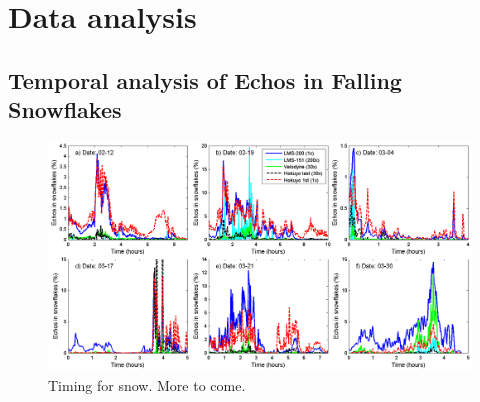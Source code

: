 \section{Data analysis}
\label{sec:data-analysis}

\subsection{Temporal analysis of Echos in Falling Snowflakes}
\begin{figure}[th]
    \centering
    \includegraphics[width=0.95\linewidth]{./img/TimingSnow.png}
    \caption{Timing for snow. More to come.}
    \label{fig:TimingSnow}
\end{figure}



